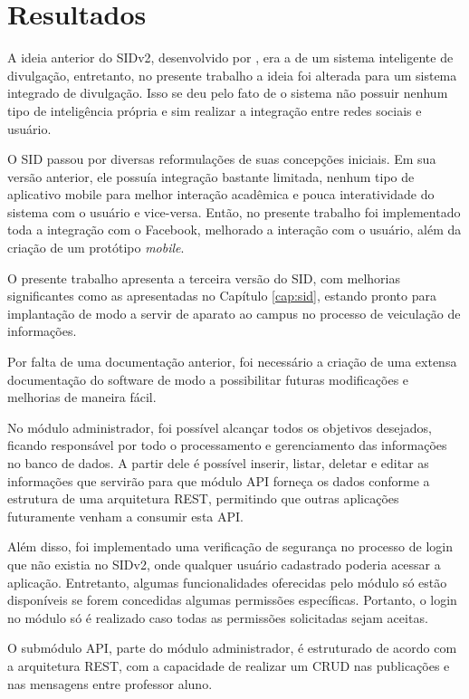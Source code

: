 \chapter[Resultados]{Resultados}
\label{resultados}
A ideia anterior do SIDv2, desenvolvido por \cite{sobrinho2017}, era a de um sistema inteligente de divulgação, entretanto, no presente trabalho a ideia foi alterada para um sistema integrado de divulgação. Isso se deu pelo fato de o sistema não possuir nenhum tipo de inteligência própria e sim realizar a integração entre redes sociais e usuário.

O SID passou por diversas reformulações de suas concepções iniciais. Em sua versão anterior, ele possuía integração bastante limitada, nenhum tipo de aplicativo mobile para melhor interação acadêmica e pouca interatividade do sistema com o usuário e vice-versa. Então, no presente trabalho foi implementado toda a integração com o Facebook, melhorado a interação com o usuário, além da criação de um protótipo \textit{mobile}.

O presente trabalho apresenta a terceira versão do SID, com melhorias significantes como as apresentadas no Capítulo \ref{cap:sid}, estando pronto para implantação de modo a servir de aparato ao campus no processo de veiculação de informações.

Por falta de uma documentação anterior, foi necessário a criação de uma extensa documentação do software de modo a possibilitar futuras modificações e melhorias de maneira fácil.

No módulo administrador, foi possível alcançar todos os objetivos desejados, ficando responsável por todo o processamento e gerenciamento das informações no banco de dados. A partir dele é possível inserir, listar, deletar e editar as informações que servirão para que módulo API forneça os dados conforme a estrutura de uma arquitetura REST, permitindo que outras aplicações futuramente venham a consumir esta API.

Além disso, foi implementado uma verificação de segurança no processo de login que não existia no SIDv2, onde qualquer usuário cadastrado poderia acessar a aplicação. Entretanto, algumas funcionalidades oferecidas pelo módulo só estão disponíveis se forem concedidas algumas permissões específicas. Portanto, o login no módulo só é realizado caso todas as permissões solicitadas sejam aceitas.

O submódulo API, parte do módulo administrador, é estruturado de acordo com a arquitetura REST, com a capacidade de realizar um CRUD nas publicações e nas mensagens entre professor aluno.

